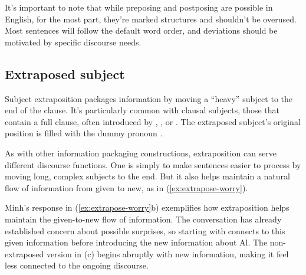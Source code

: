\ex
{}
\z

\ex 
{}
\z

\ex 
{}
\z
\z
{}

It's important to note that while preposing and postposing are possible in English, for the most part, they're marked structures and shouldn't be overused. Most sentences will follow the default word order, and deviations should be motivated by specific discourse needs.

\subsection{Extraposed subject} \label{sec:extraposition}

Subject extraposition packages information by moving a \enquote{heavy} subject to the end of the clause. It's particularly common with clausal subjects, those that contain a full clause, often introduced by , , or . The extraposed subject's original position is filled with the dummy pronoun . 

As with other information packaging constructions, extraposition can serve different discourse functions. One is simply to make sentences easier to process by moving long, complex subjects to the end. But it also helps maintain a natural flow of information from given to new, as in (\ref{ex:extrapose-worry}).

\ea\label{ex:extrapose-worry}
    \z
\z
Minh's response in (\ref{ex:extrapose-worry}b) exemplifies how extraposition helps maintain the given-to-new flow of information. The conversation has already established concern about possible surprises, so starting with  connects to this given information before introducing the new information about Al. The non-extraposed version in (c) begins abruptly with new information, making it feel less connected to the ongoing discourse.

